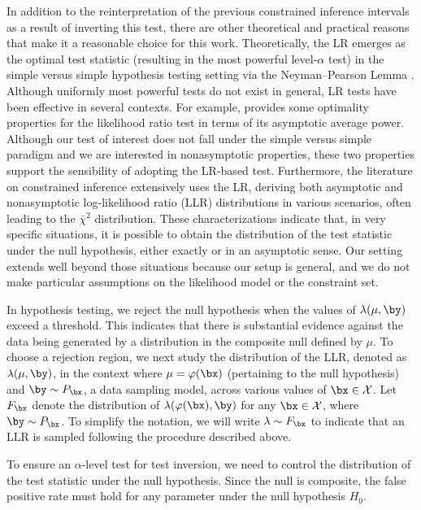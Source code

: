 \documentclass[11pt]{article}
\numberwithin{equation}{section}
\numberwithin{figure}{section}
\begin{document}
In addition to the reinterpretation of the previous constrained inference intervals as a result of inverting this test, there are other theoretical and practical reasons that make it a reasonable choice for this work. 
Theoretically, the LR emerges as the optimal test statistic (resulting in the most powerful level-$\alpha$ test) in the simple versus simple hypothesis testing setting via the Neyman--Pearson Lemma \cite{casella_berger, lehmann_romano}. 
Although uniformly most powerful tests do not exist in general, LR tests have been effective in several contexts. 
For example, \cite{wald_1943} provides some optimality properties for the likelihood ratio test in terms of its asymptotic average power.
Although our test of interest does not fall under the simple versus simple paradigm and we are interested in nonasymptotic properties, these two properties support the sensibility of adopting the LR-based test. 
Furthermore, the literature on constrained inference \cite{robertson, silvapulle2011constrained} extensively uses the LR, deriving both asymptotic and nonasymptotic log-likelihood ratio (LLR) distributions in various scenarios, often leading to the $\bar{\chi}^2$ distribution. 
These characterizations indicate that, in very specific situations, it is possible to obtain the distribution of the test statistic under the null hypothesis, either exactly or in an asymptotic sense. 
Our setting extends well beyond those situations because our setup is general, and we do not make particular assumptions on the likelihood model or the constraint set. 

In hypothesis testing, we reject the null hypothesis when the values of $\lambda(\mu, \by)$ exceed a threshold. 
This indicates that there is substantial evidence against the data being generated by a distribution in the composite null defined by $\mu$.
To choose a rejection region, we next study the distribution of the LLR, denoted as $\lambda(\mu, \by)$, in the context where $\mu = \varphi(\bx)$ (pertaining to the null hypothesis) and $\by \sim P_{\bx}$, a data sampling model, across various values of $\bx \in \mathcal X$.
Let $F_\bx$ denote the distribution of $\lambda(\varphi(\bx), \by)$ for any $\bx \in \mathcal X$, where $\by \sim P_\bx$.
To simplify the notation, we will write $\lambda \sim F_\bx$ to indicate that an LLR is sampled following the procedure described above.

To ensure an $\alpha$-level test for test inversion, we need to control the distribution of the test statistic under the null hypothesis. 
Since the null is composite, the false positive rate must hold for any parameter under the null hypothesis $H_0$. 
\end{document}
